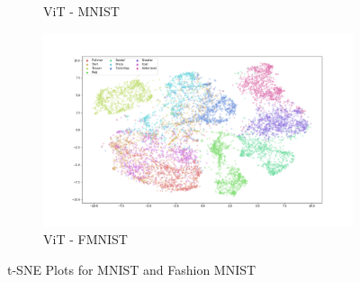 \documentclass{article}
\theoremstyle{definition}
\begin{document}
\begin{figure}[h!]
\begin{subfigure}{.48\textwidth}
        \caption{ViT - MNIST}
    \end{subfigure}
    \begin{subfigure}{.48\textwidth}
        \includegraphics[width=\linewidth]{Final project/img/FMNIST_vit-base-patch32-384_train.png}
        \caption{ViT - FMNIST}
    \end{subfigure}
    \caption{t-SNE Plots for MNIST and Fashion MNIST}
    \label{fig:tsne2}
\end{figure}
\end{document}
